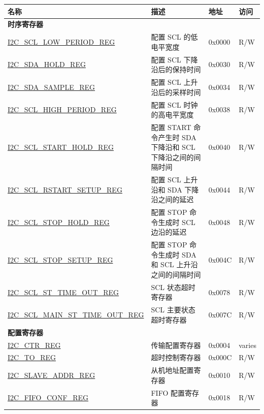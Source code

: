 \begin{longtable}{  | m{5.7cm} | m{7cm} | m{1.3cm} | m{1.5cm} | }
\hline\rowcolor{lightgray}
名称 & 描述 &  地址 & 访问 \\ \hline
\endhead
\multicolumn{4}{|l|}{\textbf{时序寄存器}} \\ \hline
\hyperref[regdesc:I2CSCLLOWPERIODREG]{I2C\_SCL\_LOW\_PERIOD\_REG} & 配置 SCL 的低电平宽度 & 0x0000 & R/W \\ \hline
\hyperref[regdesc:I2CSDAHOLDREG]{I2C\_SDA\_HOLD\_REG} & 配置 SCL 下降沿后的保持时间 & 0x0030 & R/W \\ \hline
\hyperref[regdesc:I2CSDASAMPLEREG]{I2C\_SDA\_SAMPLE\_REG} & 配置 SCL 上升沿后的采样时间 & 0x0034 & R/W \\ \hline
\hyperref[regdesc:I2CSCLHIGHPERIODREG]{I2C\_SCL\_HIGH\_PERIOD\_REG} & 配置 SCL 时钟的高电平宽度 & 0x0038 & R/W \\ \hline
\hyperref[regdesc:I2CSCLSTARTHOLDREG]{I2C\_SCL\_START\_HOLD\_REG} & 配置 START 命令产生时 SDA 下降沿和 SCL 下降沿之间的间隔时间 & 0x0040 & R/W \\ \hline
\hyperref[regdesc:I2CSCLRSTARTSETUPREG]{I2C\_SCL\_RSTART\_SETUP\_REG} & 配置 SCL 上升沿和 SDA 下降沿之间的延迟 & 0x0044 & R/W \\ \hline
\hyperref[regdesc:I2CSCLSTOPHOLDREG]{I2C\_SCL\_STOP\_HOLD\_REG} & 配置 STOP 命令生成时 SCL 边沿的延迟 & 0x0048 & R/W \\ \hline
\hyperref[regdesc:I2CSCLSTOPSETUPREG]{I2C\_SCL\_STOP\_SETUP\_REG} & 配置 STOP 命令生成时 SDA 和 SCL 上升沿之间的间隔时间 & 0x004C & R/W \\ \hline
\hyperref[regdesc:I2CSCLSTTIMEOUTREG]{I2C\_SCL\_ST\_TIME\_OUT\_REG} & SCL 状态超时寄存器 & 0x0078 & R/W \\ \hline
\hyperref[regdesc:I2CSCLMAINSTTIMEOUTREG]{I2C\_SCL\_MAIN\_ST\_TIME\_OUT\_REG} & SCL 主要状态超时寄存器 & 0x007C & R/W \\ \hline
\multicolumn{4}{|l|}{\textbf{配置寄存器}} \\ \hline
\hyperref[regdesc:I2CCTRREG]{I2C\_CTR\_REG} & 传输配置寄存器 & 0x0004 & varies \\ \hline
\hyperref[regdesc:I2CTOREG]{I2C\_TO\_REG} & 超时控制寄存器 & 0x000C & R/W \\ \hline
\hyperref[regdesc:I2CSLAVEADDRREG]{I2C\_SLAVE\_ADDR\_REG} & 从机地址配置寄存器 & 0x0010 & R/W \\ \hline
\hyperref[regdesc:I2CFIFOCONFREG]{I2C\_FIFO\_CONF\_REG} & FIFO 配置寄存器 & 0x0018 & R/W \\ \hline

\end{longtable}
